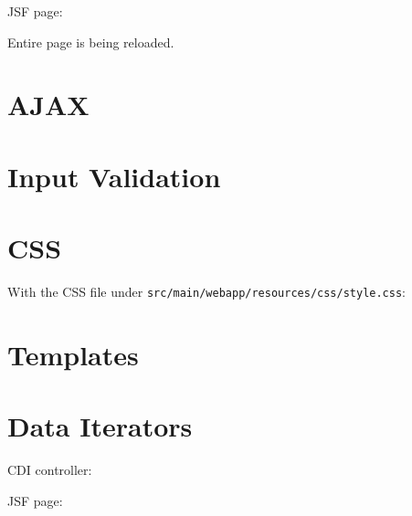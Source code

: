 JSF page:


Entire page is being reloaded.

\section{AJAX}



\section{Input Validation}



\section{CSS}



With the CSS file under \texttt{src/main/webapp/resources/css/style.css}:




\section{Templates}

\section{Data Iterators}

CDI controller:


JSF page:
